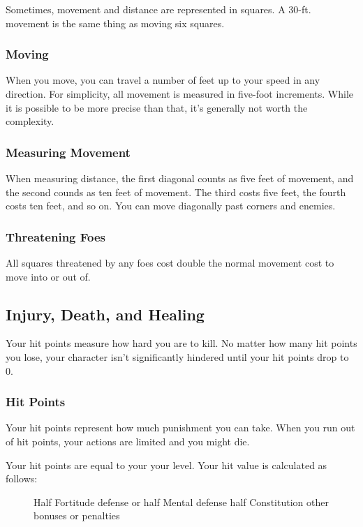 Sometimes, movement and distance are represented in squares.
A 30-ft. movement is the same thing as moving six squares.

\subsubsection{Moving}

When you move, you can travel a number of feet up to your speed in any direction.
For simplicity, all movement is measured in five-foot increments.
While it is possible to be more precise than that, it's generally not worth the complexity.

\subsubsection{Measuring Movement}

 When measuring distance, the first diagonal counts as five feet of movement, and the second counds as ten feet of movement.
The third costs five feet, the fourth costs ten feet, and so on.
You can move diagonally past corners and enemies.

\subsubsection{Threatening Foes}
All squares threatened by any foes cost double the normal movement cost to move into or out of.

\subsection{Injury, Death, and Healing}\label{Injury, Death, and Healing}
Your hit points measure how hard you are to kill.
No matter how many hit points you lose, your character isn't significantly hindered until your hit points drop to 0.

\subsubsection{Hit Points}\label{Hit Points}
Your hit points represent how much punishment you can take.
When you run out of hit points, your actions are limited and you might die.

Your hit points are equal to your  \mtimes your level.
Your hit value is calculated as follows:

\begin{figure}[h]
    \centering Half Fortitude defense or half Mental defense \add half Constitution \add other bonuses or penalties
\end{figure}

